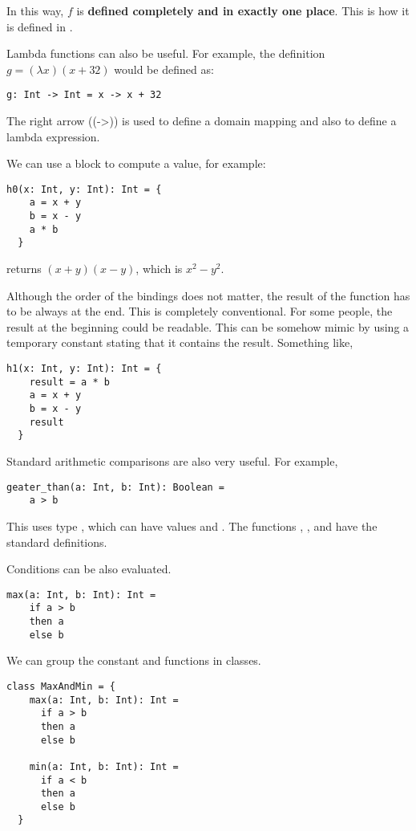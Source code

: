 In this way, $f$ is \textbf{defined completely and in exactly one place}.
This is how it is defined in \Soda.

Lambda functions can also be useful.
For example, the definition
$g = (\lambda x)(x + 32)$
would be defined as:
\begin{lstlisting}[label={lst:exampleFunctionDefinitionWithLambda}]
  g: Int -> Int = x -> x + 32
\end{lstlisting}

The right arrow (\srccode(->)) is used to define a domain mapping and also to define a lambda expression.


We can use a block to compute a value, for example:
\begin{lstlisting}[label={lst:exampleFunctionDefinitionWithBlock}]
  h0(x: Int, y: Int): Int = {
    a = x + y
    b = x - y
    a * b
  }
\end{lstlisting}
returns $(x + y)(x - y)$, which is $x^{2} - y^{2}$.

Although the order of the bindings does not matter, the result of the function has to be always at the end.
This is completely conventional.
For some people, the result at the beginning could be readable.
This can be somehow mimic by using a temporary constant stating that it contains the result.
Something like,
\begin{lstlisting}[label={lst:exampleFunctionDefinitionWithBlockAndResult}]
  h1(x: Int, y: Int): Int = {
    result = a * b
    a = x + y
    b = x - y
    result
  }
\end{lstlisting}

Standard arithmetic comparisons are also very useful.
For example,
\begin{lstlisting}[label={lst:exampleComparison}]
  geater_than(a: Int, b: Int): Boolean =
    a > b
\end{lstlisting}

This uses type , which can have values \sfalse and \strue.
The functions \sand, \sor, and \snot have the standard definitions.

Conditions can be also evaluated.
\begin{lstlisting}[label={lst:exampleMax}]
  max(a: Int, b: Int): Int =
    if a > b
    then a
    else b
\end{lstlisting}

We can group the constant and functions in classes.

\begin{lstlisting}[label={lst:exampleClassMax}]
  class MaxAndMin = {
    max(a: Int, b: Int): Int =
      if a > b
      then a
      else b

    min(a: Int, b: Int): Int =
      if a < b
      then a
      else b
  }
\end{lstlisting}

